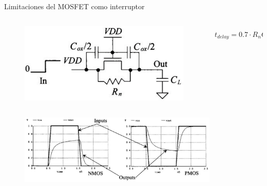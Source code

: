 \documentclass[aspectratio=169,t]{beamer}
\begin{document}
\begin{frame}{Limitaciones del MOSFET como interruptor}

\vspace{-5mm}
\begin{columns}

\begin{column}{0.4\textwidth}

\begin{figure}
    \centering
    \includegraphics[width=\textwidth]{figuras/passgate_capacitances.png}
\end{figure}

\end{column}

\begin{column}{0.6\textwidth}

\[ t_{delay} = 0.7 \cdot R_n C_{tot} = 0.7 \cdot R_n \cdot \left( C_L + \dfrac{C_{ox}}{2} \right) \]

\end{column}
    
\end{columns}

\begin{figure}
    \centering
    \includegraphics[width=0.85\textwidth]{figuras/passgate_response.png}
\end{figure}


\end{frame}
\end{document}

